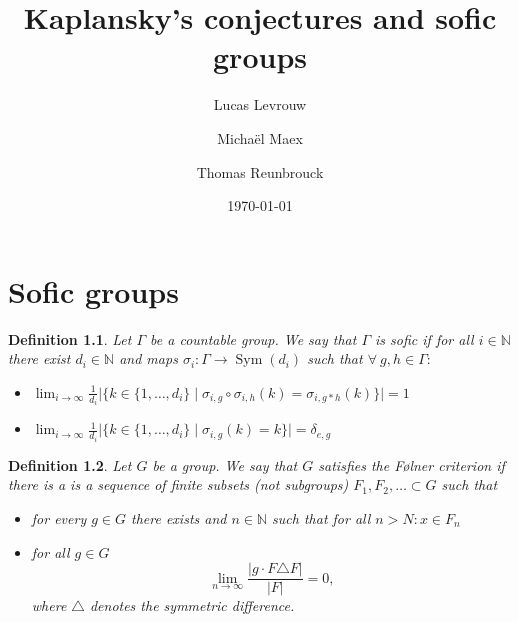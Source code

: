 \documentclass[a4paper]{memoir}
\author{Lucas Levrouw \and Michaël Maex \and Thomas Reunbrouck}
\title{Kaplansky's conjectures and sofic groups}
\date{\today}
\newcommand{\N}{\mathbb{N}}
\newtheorem{definition}{Definition}
\DeclareMathOperator{\sym}{Sym}
\begin{document}
    \maketitle
    \chapter{Sofic groups}
    \begin{definition}
        Let $\Gamma$ be a countable group. We say that $\Gamma$ is sofic if for all $i\in \N$ there exist $d_i \in \N$ and maps $\sigma_i : \Gamma \to \sym(d_i)$ such that $\forall\ g, h \in \Gamma:$
        \begin{itemize}
            \item $\displaystyle \lim_{i\to \infty} \frac{1}{d_i} \big|\big\{k \in \{1, \dots, d_i\} \mid \sigma_{i,g} \circ \sigma_{i,h}(k) = \sigma_{i, g*h} (k) \big\}\big| = 1$
            \item $\displaystyle \lim_{i\to \infty} \frac{1}{d_i}  \big|\big\{k \in \{1, \dots, d_i\} \mid \sigma_{i,g}(k) = k \big\}\big| = \delta_{e,g}$
        \end{itemize}
    \end{definition}

    \begin{definition}\cite{noauthor_folner_2019}
        Let $G$ be a group. We say that $G$ satisfies the Følner criterion if there is a is a sequence of finite subsets (not subgroups) $F_1, F_2, \dots \subset G$ such that 
        \begin{itemize}
            \item for every $g \in G$ there exists and $n \in \N$ such that for all $n > N: x \in F_n$
            \item for all $g \in G$ 
            $$\lim_{n\to \infty} \frac{\left| g \cdot F \triangle F \right|}{\left| F \right|} = 0, $$
            where $\triangle$ denotes the symmetric difference.
        \end{itemize}
    \end{definition}

    \printbibliography
\end{document}
